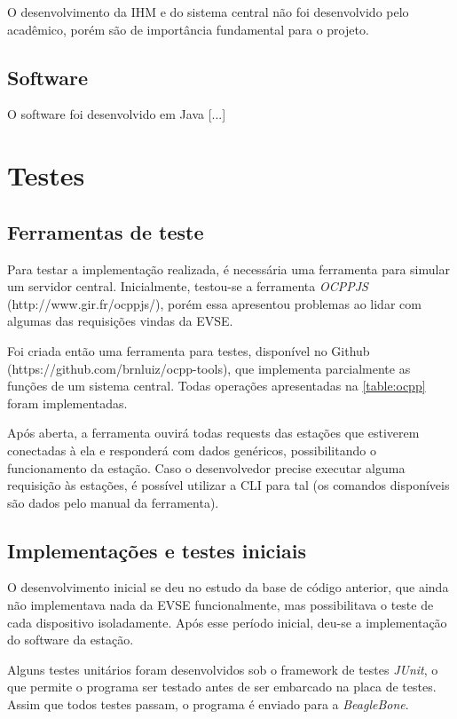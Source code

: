 O desenvolvimento da IHM e do sistema central não foi desenvolvido pelo acadêmico, porém são de importância fundamental para o projeto.

\subsection{Software}

O software foi desenvolvido em Java [...]

\section{Testes}

\subsection{Ferramentas de teste}

Para testar a implementação realizada, é necessária uma ferramenta para simular um servidor central. Inicialmente, testou-se a ferramenta \textit{OCPPJS} (http://www.gir.fr/ocppjs/), porém essa apresentou problemas ao lidar com algumas das requisições vindas da EVSE.

Foi criada então uma ferramenta para testes, disponível no Github (https://github.com/brnluiz/ocpp-tools), que implementa parcialmente as funções de um sistema central. Todas operações apresentadas na \ref{table:ocpp} foram implementadas.

Após aberta, a ferramenta ouvirá todas requests das estações que estiverem conectadas à ela e responderá com dados genéricos, possibilitando o funcionamento da estação. Caso o desenvolvedor precise executar alguma requisição às estações, é possível utilizar a \ac{CLI} para tal (os comandos disponíveis são dados pelo manual da ferramenta).

\subsection{Implementações e testes iniciais}

O desenvolvimento inicial se deu no estudo da base de código anterior, que ainda não implementava nada da EVSE funcionalmente, mas possibilitava o teste de cada dispositivo isoladamente. Após esse período inicial, deu-se a implementação do software da estação.

Alguns testes unitários foram desenvolvidos sob o framework de testes \textit{JUnit}, o que permite o programa ser testado antes de ser embarcado na placa de testes. Assim que todos testes passam, o programa é enviado para a \textit{BeagleBone}.

